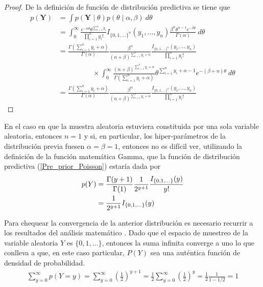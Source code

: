 \documentclass[10pt,openright]{book}\usepackage[]{graphicx}\usepackage[]{color}
\begin{document}
    \begin{proof}
    De la definici\'on de funci\'on de distribuci\'on predictiva se tiene que 
    \begin{align*}
    p(\mathbf{Y})&=\int p(\mathbf{Y} \mid \theta)p(\theta \mid \alpha,\beta)\ d\theta\\
    &=\int_0^{\infty} \frac{e^{-n\theta}\theta^{\sum_{i=1}^ny_i}}{\prod_{i=1}^ny_i!}I_{\{0,1,\ldots\}^n}(y_1,\ldots,y_n)
    \frac{\beta^\alpha \theta^{\alpha-1} e^{-\beta\theta}}{\Gamma(\alpha)}\ d\theta\\
    &=\frac{\Gamma(\sum_{i=1}^ny_i+\alpha)}{\Gamma(\alpha)}\frac{\beta^\alpha}{(n+\beta)^{\sum_{i=1}^ny_i+\alpha}}
    \frac{I_{\{0,1,\ldots\}^n}(y_1,\ldots,y_n)}{\prod_{i=1}^ny_i!}\\
    &\hspace{2cm}\times
    \int_0^{\infty} \frac{(n+\beta)^{\sum_{i=1}^ny_i+\alpha}}{\Gamma(\sum_{i=1}^ny_i+\alpha)}
    \theta^{\sum_{i=1}^ny_i+\alpha-1}e^{-(\beta+n)\theta} \ d\theta\\
    &=\frac{\Gamma(\sum_{i=1}^ny_i+\alpha)}{\Gamma(\alpha)}\frac{\beta^\alpha}{(n+\beta)^{\sum_{i=1}^ny_i+\alpha}}
    \frac{I_{\{0,1,\ldots\}^n}(y_1,\ldots,y_n)}{\prod_{i=1}^ny_i!}
    \end{align*}
    \end{proof}
    
    En el caso en que la muestra aleatoria estuviera constituida por una sola variable aleatoria, entonces $n=1$ y si, en particular, los hiper-par\'ametros de la distribuci\'on previa fuesen $\alpha=\beta=1$, entonces no es dif\'icil ver, utilizando la definici\'on de la funci\'on matem\'atica Gamma, que la funci\'on de distribuci\'on predictiva (\ref{Pre_prior_Poisson}) estar\'ia dada por
    \begin{align}\label{Pre_prior_poisson1}
    p(Y)&=\frac{\Gamma(y+1)}{\Gamma(1)}\frac{1}{2^{y+1}}\frac{I_{\{0,1,\ldots\}}(y)}{y!} \notag\\
    &=\frac{1}{2^{y+1}}I_{\{0,1,\ldots\}}(y)
    \end{align}
    
    Para chequear la convergencia de la anterior distribuci\'on es necesario recurrir a los resultados del an\'alisis matem\'atico \cite[p. 361]{Apostol}. Dado que el espacio de muestreo de la variable aleatoria $Y$ es $\{0,1,\ldots\}$, entonces la suma infinita converge a uno lo que conlleva a que, en este caso particular, $P(Y)$ sea una aut\'entica funci\'on de densidad de probabilidad.
    \begin{align*}
    \sum_{y=0}^{\infty}p(Y=y)=\sum_{y=0}^{\infty}\left(\frac{1}{2}\right)^{y+1}=\frac{1}{2}\sum_{y=0}^{\infty}\left(\frac{1}{2}\right)^{y}
    =\frac{1}{2}\frac{1}{1-1/2}=1
    \end{align*}
    
\end{document}
